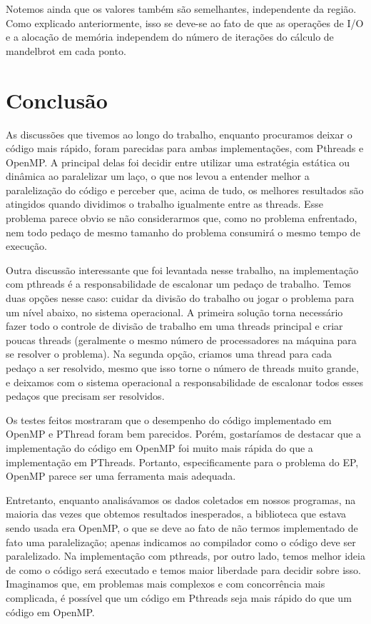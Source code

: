 \documentclass[12pt]{article}
\begin{document}
Notemos ainda que os valores também são semelhantes, independente da região. Como explicado anteriormente, isso se deve-se ao fato de que as operações de I/O e a alocação de memória independem do número de iterações do cálculo de mandelbrot em cada ponto.


\newpage
\section{Conclusão}
As discussões que tivemos ao longo do trabalho, enquanto procuramos
deixar o código mais rápido, foram parecidas para ambas implementações,
com Pthreads e OpenMP. A principal delas foi decidir entre utilizar
uma estratégia estática ou dinâmica ao paralelizar um laço, o que nos
levou a entender melhor a paralelização do código e perceber que, acima
de tudo, os melhores resultados são atingidos quando dividimos o 
trabalho igualmente entre as threads. Esse problema parece obvio se não
considerarmos que, como no problema enfrentado, nem todo pedaço de mesmo
tamanho do problema consumirá o mesmo tempo de execução.

Outra discussão interessante que foi levantada nesse trabalho, na 
implementação com pthreads é a responsabilidade de escalonar um
pedaço de trabalho. Temos duas opções nesse caso: cuidar da divisão do
trabalho ou jogar o problema para um nível abaixo, no sistema 
operacional. A primeira solução torna necessário fazer todo o controle 
de divisão de trabalho em uma threads principal e criar poucas threads 
(geralmente o mesmo número de processadores na máquina para se resolver 
o problema).  Na segunda opção, criamos uma thread para cada pedaço
a ser resolvido, mesmo que isso torne o número de threads muito grande,
e deixamos com o sistema operacional a responsabilidade de escalonar
todos esses pedaços que precisam ser resolvidos.

Os testes feitos mostraram que o desempenho do código implementado em
OpenMP e PThread foram bem parecidos. Porém, gostaríamos de destacar que
a implementação do código em OpenMP foi muito mais rápida do que a
implementação em PThreads. Portanto, especificamente para o problema do 
EP, OpenMP parece ser uma ferramenta mais adequada. 

Entretanto, enquanto analisávamos os dados coletados em nossos 
programas, na maioria das vezes que obtemos resultados inesperados, a 
biblioteca que estava sendo usada era OpenMP, o que se deve ao fato de
não termos implementado de fato uma paralelização; apenas indicamos ao
compilador como o código deve ser paralelizado. Na implementação com
pthreads, por outro lado, temos melhor ideia de como o código será 
executado e temos maior liberdade para decidir sobre isso. Imaginamos 
que, em problemas mais complexos e com concorrência mais complicada,
é possível que um código em Pthreads seja mais rápido do que um código
em OpenMP.


\newpage
\end{document}

